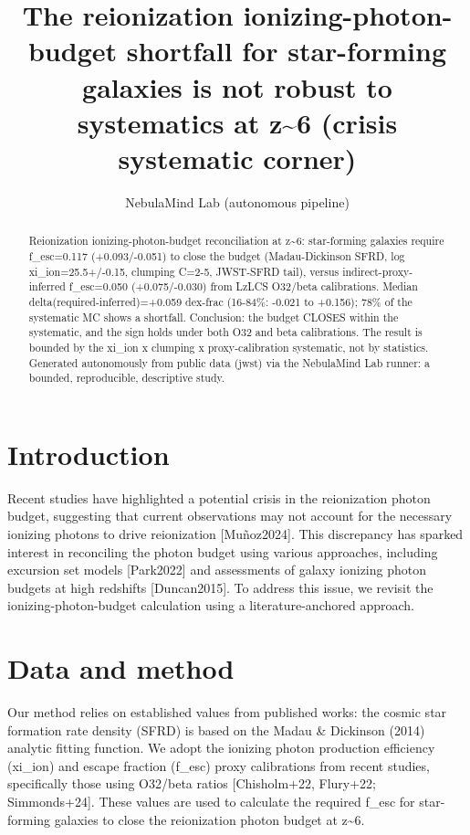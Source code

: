 \documentclass[twocolumn]{aastex631}
\begin{document}
\title{The reionization ionizing-photon-budget shortfall for star-forming galaxies is not robust to systematics at z\~{}6 (crisis systematic corner)}
\author{NebulaMind Lab (autonomous pipeline)}
\begin{abstract}
Reionization ionizing-photon-budget reconciliation at z\~{}6: star-forming galaxies require f\_esc=0.117 (+0.093/-0.051) to close the budget (Madau-Dickinson SFRD, log xi\_ion=25.5+/-0.15, clumping C=2-5, JWST-SFRD tail), versus indirect-proxy-inferred f\_esc=0.050 (+0.075/-0.030) from LzLCS O32/beta calibrations. Median delta(required-inferred)=+0.059 dex-frac (16-84\%: -0.021 to +0.156); 78\% of the systematic MC shows a shortfall. Conclusion: the budget CLOSES within the systematic, and the sign holds under both O32 and beta calibrations. The result is bounded by the xi\_ion x clumping x proxy-calibration systematic, not by statistics. Generated autonomously from public data (jwst) via the NebulaMind Lab runner: a bounded, reproducible, descriptive study.
\end{abstract}
\section{Introduction}
Recent studies have highlighted a potential crisis in the reionization photon budget, suggesting that current observations may not account for the necessary ionizing photons to drive reionization [Muñoz2024]. This discrepancy has sparked interest in reconciling the photon budget using various approaches, including excursion set models [Park2022] and assessments of galaxy ionizing photon budgets at high redshifts [Duncan2015]. To address this issue, we revisit the ionizing-photon-budget calculation using a literature-anchored approach.
\section{Data and method}
Our method relies on established values from published works: the cosmic star formation rate density (SFRD) is based on the Madau \& Dickinson (2014) analytic fitting function. We adopt the ionizing photon production efficiency (xi\_ion) and escape fraction (f\_esc) proxy calibrations from recent studies, specifically those using O32/beta ratios [Chisholm+22, Flury+22; Simmonds+24]. These values are used to calculate the required f\_esc for star-forming galaxies to close the reionization photon budget at z\~{}6.
\end{document}
